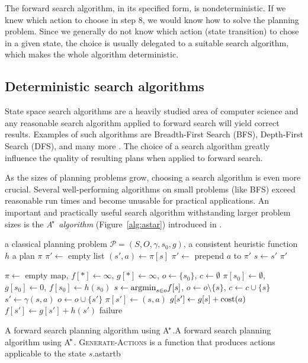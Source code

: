 The forward search algorithm, in its specified form, is nondeterministic.
If we knew which action to choose in step 8,
we would know how to solve the planning problem.
Since we generally do not know which action (state transition) to chose in a given state, the choice is usually delegated to a suitable
search algorithm, which makes the whole algorithm deterministic.


\subsection{Deterministic search algorithms}

State space search algorithms are a heavily studied area
of computer science and any reasonable search algorithm applied
to forward search will yield correct results.
Examples of such algorithms are Breadth-First Search (BFS), 
Depth-First Search (DFS), and many more \citep[Section~3.5]{Russell1995}.
The choice of a search algorithm greatly influence
the quality of resulting plans when applied to forward search.

As the sizes of planning problems grow,
choosing a search algorithm is even more crucial.
Several well-performing algorithms on small problems (like BFS)
exceed reasonable run times and become unusable for practical applications.
An important and practically useful search algorithm
withstanding larger problem sizes is the \textit{A$^{\kern-.15em*}$ algorithm} (Figure~\ref{alg:astar})
introduced in \citet{Hart1968}.

%
{%
\Input a classical planning problem $\mathcal{P} = (S, O, \gamma, s_0, g)$,
a consistent heuristic function $h$
\Output a plan $\pi$
\State $\pi' \gets $ empty list
	\State $(s', a) \gets \pi[s]$
	\State $\pi' \gets$ prepend $a$ to $\pi'$
	\State $s \gets s'$
\EndWhile
\State \Return $\pi'$
\EndFunction

\State $\pi \gets $ empty map, $f[*] \gets \infty$, $g[*] \gets \infty$, $o \gets \{s_0\}$, $c \gets \emptyset$
\State $\pi[s_0] \gets \emptyset$, 
$g[s_0] \gets 0$, $f[s_0] \gets h(s_0)$
\State $s \gets \textrm{argmin}_{s \in o} f[s]$, $o \gets o \setminus \{s\}$, $c \gets c \cup \{s\}$
 \Return {} \EndIf
{}
	\State $s' \gets \gamma(s, a)$
	 
		 $o \gets o \cup \{s'\}$  \EndIf 
		 
			\State $\pi[s'] \gets (s, a)$
			\State $g[s'] \gets g[s] + \textrm{cost}(a)$
			\State $f[s'] \gets g[s'] + h(s')$
		\EndIf
	\EndIf
\EndFor
\EndWhile
\Return failure
\EndFunction
}%
{A forward search planning algorithm using A$^{\kern-.15em*}$.}{A forward search planning algorithm using A$^{\kern-.15em*}$.
\textsc{Generate-Actions} is a function that produces actions applicable to the state $s$.}{astar}{tb}

